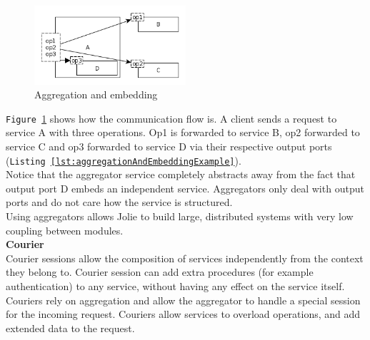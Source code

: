 \documentclass[12pt,a4paper]{article}
\begin{document}
\begin{figure}[h!]
  \centering
    \includegraphics[width=0.5\textwidth]{../figures/jolie_aggregation_and_embedding_example.png}
  \caption{Aggregation and embedding}
  \label{fig:aggregationAndEmbedding}
\end{figure}

\texttt{Figure \ref{fig:aggregationAndEmbedding}} shows how the communication flow is. A client sends a request to service A with three operations. Op1 is forwarded to service B, op2 forwarded to service C and op3 forwarded to service D via their respective output ports (\texttt{Listing \ref{lst:aggregationAndEmbeddingExample}}). \\
Notice that the aggregator service completely abstracts away from the fact that output port D embeds an independent service. Aggregators only deal with output ports and do not care how the service is structured. \\
Using aggregators allows Jolie to build large, distributed systems with very low coupling between modules. \\

\textbf{Courier} \\
Courier sessions allow the composition of services independently from the context they belong to. Courier session can add extra procedures (for example authentication) to any service, without having any effect on the service itself.\\
Couriers rely on aggregation and allow the aggregator to handle a special session for the incoming request. Couriers allow services to overload operations, and add extended data to the request. 
\end{document}
